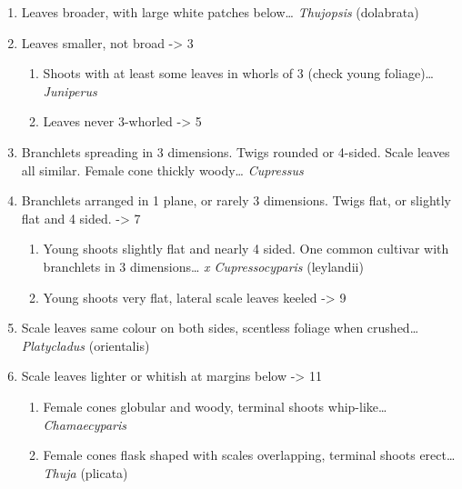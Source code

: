 \documentclass[openany]{book}
\providecommand{\tightlist}{%
  \setlength{\itemsep}{0pt}\setlength{\parskip}{0pt}}
\begin{document}
\begin{enumerate}
\def\labelenumi{\arabic{enumi}.}
\tightlist
\item
  Leaves broader, with large white patches below\ldots{}
  \emph{Thujopsis} (dolabrata)
\item
  Leaves smaller, not broad -\textgreater{} 3

  \begin{enumerate}
  \def\labelenumii{\arabic{enumii}.}
  \setcounter{enumii}{2}
  \tightlist
  \item
    Shoots with at least some leaves in whorls of 3 (check young
    foliage)\ldots{} \emph{Juniperus}
  \item
    Leaves never 3-whorled -\textgreater{} 5
  \end{enumerate}
\item
  Branchlets spreading in 3 dimensions. Twigs rounded or 4-sided. Scale
  leaves all similar. Female cone thickly woody\ldots{} \emph{Cupressus}
\item
  Branchlets arranged in 1 plane, or rarely 3 dimensions. Twigs flat, or
  slightly flat and 4 sided. -\textgreater{} 7

  \begin{enumerate}
  \def\labelenumii{\arabic{enumii}.}
  \setcounter{enumii}{6}
  \tightlist
  \item
    Young shoots slightly flat and nearly 4 sided. One common cultivar
    with branchlets in 3 dimensions\ldots{} \emph{x Cupressocyparis}
    (leylandii)
  \item
    Young shoots very flat, lateral scale leaves keeled -\textgreater{}
    9
  \end{enumerate}
\item
  Scale leaves same colour on both sides, scentless foliage when
  crushed\ldots{} \emph{Platycladus} (orientalis)
\item
  Scale leaves lighter or whitish at margins below -\textgreater{} 11

  \begin{enumerate}
  \def\labelenumii{\arabic{enumii}.}
  \setcounter{enumii}{10}
  \tightlist
  \item
    Female cones globular and woody, terminal shoots whip-like\ldots{}
    \emph{Chamaecyparis}
  \item
    Female cones flask shaped with scales overlapping, terminal shoots
    erect\ldots{} \emph{Thuja} (plicata)
  \end{enumerate}
\end{enumerate}
\end{document}
